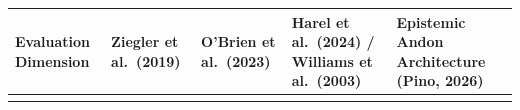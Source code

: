 \documentclass[
  10pt,letterpaper]{article}
\begin{document}
\begin{table}[htbp]
\centering
\begin{tabular}{@{}
  >{\raggedright\arraybackslash}p{}
  >{\raggedright\arraybackslash}p{}
  >{\raggedright\arraybackslash}p{}
  >{\raggedright\arraybackslash}p{}
  >{\raggedright\arraybackslash}p{}@{}}
\toprule\noalign{}
\begin{minipage}[b]{\linewidth}\raggedright
Evaluation Dimension
\end{minipage} & \begin{minipage}[b]{\linewidth}\raggedright
Ziegler et al.~(2019)
\end{minipage} & \begin{minipage}[b]{\linewidth}\raggedright
O'Brien et al.~(2023)
\end{minipage} & \begin{minipage}[b]{\linewidth}\raggedright
Harel et al.~(2024) / Williams et al.~(2003)
\end{minipage} & \begin{minipage}[b]{\linewidth}\raggedright
Epistemic Andon Architecture (Pino, 2026)
\end{minipage} \\
\midrule\noalign{}

\bottomrule\noalign{}


\end{tabular}
\end{table}
\end{document}
